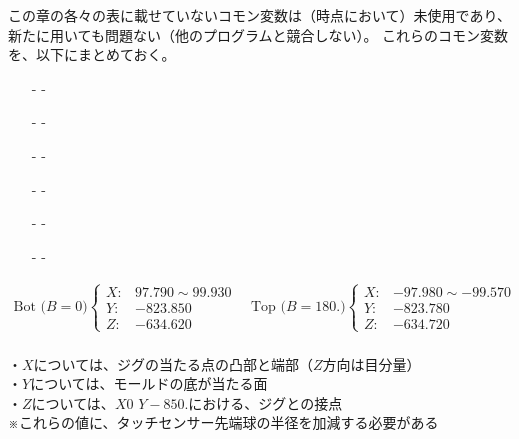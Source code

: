 \clearpage
この章の各々の表に載せていないコモン変数は（\dateUnusedVariables 時点において）未使用であり、新たに用いても問題ない（他のプログラムと競合しない）。
これらのコモン変数を、以下にまとめておく。
\begin{enumerate}
\item[-] -
\item[-] -
\item[-] -
\item[-] -
\item[-] -
\item[-] -
\end{enumerate}


\vfill
\begin{tcolorbox}[title={2023/07/28時点の\MMname 実測値}, fonttitle=\gtfamily\bfseries]
\begin{align*}
  \text{Bot ($B=0$)}
  \left\{
  \begin{array}{rl}
    X: & 97.790 \sim 99.930\\
    Y: & -823.850\\
    Z: & -634.620
  \end{array}
  \right.\quad
  \text{Top ($B=180.$)}
  \left\{
  \begin{array}{rl}
    X: & -97.980 \sim -99.570\\
    Y: & -823.780\\
    Z: & -634.720
  \end{array}
  \right.
\end{align*}\\
・$X$については、ジグの当たる点の凸部と端部（$Z$方向は目分量）\\
・$Y$については、モールドの底が当たる面\\
・$Z$については、$X0$ $Y-850.$における、ジグとの接点\\
※これらの値に、タッチセンサー先端球の半径を加減する必要がある
\end{tcolorbox}
